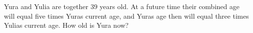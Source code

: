 Yura and Yulia are together $39$ years old. At a future time their combined age will equal five times Yura\textquotesingle s current age, and Yura\textquotesingle s age then will equal three times Yulia\textquotesingle s current age. How old is Yura now?
